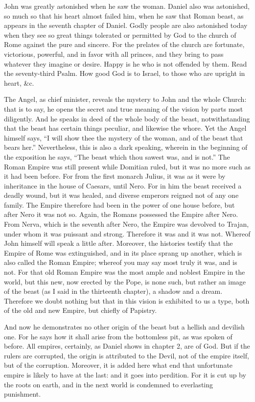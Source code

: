 John was greatly astonished when he saw the woman. Daniel also was astonished, so much so that his heart almost failed him, when he saw that Roman beast, as appears in the seventh chapter of Daniel. Godly people are also astonished today when they see so great things tolerated or permitted by God to the church of Rome against the pure and sincere. For the prelates of the church are fortunate, victorious, powerful, and in favor with all princes, and they bring to pass whatever they imagine or desire. Happy is he who is not offended by them. Read the seventy-third Psalm. How good God is to Israel, to those who are upright in heart, \&c.

The Angel, as chief minister, reveals the mystery to John and the whole Church: that is to say, he opens the secret and true meaning of the vision by parts most diligently. And he speaks in deed of the whole body of the beast, notwithstanding that the beast has certain things peculiar, and likewise the whore. Yet the Angel himself says, “I will show thee the mystery of the woman, and of the beast that bears her.” Nevertheless, this is also a dark speaking, wherein in the beginning of the exposition he says, “The beast which thou sawest was, and is not.” The Roman Empire was still present while Domitian ruled, but it was no more such as it had been before. For from the first monarch Julius, it was as it were by inheritance in the house of Caesars, until Nero. For in him the beast received a deadly wound, but it was healed, and diverse emperors reigned not of any one family. The Empire therefore had been in the power of one house before, but after Nero it was not so. Again, the Romans possessed the Empire after Nero. From Nerva, which is the seventh after Nero, the Empire was devolved to Trajan, under whom it was puissant and strong. Therefore it was and it was not. Whereof John himself will speak a little after. Moreover, the histories testify that the Empire of Rome was extinguished, and in its place sprang up another, which is also called the Roman Empire; whereof you may say most truly it was, and is not. For that old Roman Empire was the most ample and noblest Empire in the world, but this new, now erected by the Pope, is none such, but rather an image of the beast (as I said in the thirteenth chapter), a shadow and a dream. Therefore we doubt nothing but that in this vision is exhibited to us a type, both of the old and new Empire, but chiefly of Papistry.

And now he demonstrates no other origin of the beast but a hellish and devilish one. For he says how it shall arise from the bottomless pit, as was spoken of before. All empires, certainly, as Daniel shows in chapter 2, are of God. But if the rulers are corrupted, the origin is attributed to the Devil, not of the empire itself, but of the corruption. Moreover, it is added here what end that unfortunate empire is likely to have at the last: and it goes into perdition. For it is cut up by the roots on earth, and in the next world is condemned to everlasting punishment.

